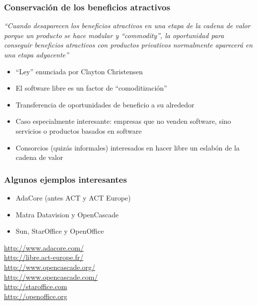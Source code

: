 \begin{frame}
\frametitle{Conservación de los beneficios atractivos}

{\em ``Cuando desaparecen los beneficios atractivos en una etapa de la
  cadena de valor porque un producto se hace modular y ``commodity'',
  la oportunidad para conseguir beneficios atractivos con productos
  privativos normalmente aparecerá en una etapa adyacente''}

\begin{itemize}
\item ``Ley'' enunciada por Clayton Christensen
\item El software libre es un factor de ``comoditización''
\item Transferencia de oportunidades de beneficio a su alrededor
\item Caso especialmente interesante: empresas que no venden software,
  sino servicios o productos basados en software
\item Consorcios (quizás informales) interesados en hacer libre un
  eslabón de la cadena de valor
\end{itemize}
\end{frame}



\begin{frame}
\frametitle{Algunos ejemplos interesantes}

\begin{itemize}
\item AdaCore (antes ACT y ACT Europe)
\item Matra Datavision y OpenCascade
\item Sun, StarOffice y OpenOffice
\end{itemize}

\begin{flushright}
  \url{http://www.adacore.com/}  \\
  \url{http://libre.act-europe.fr/} \\
  \url{http://www.opencascade.org/} \\
  \url{http://www.opencascade.com/} \\
  \url{http://staroffice.com} \\
  \url{http://openoffice.org}
\end{flushright}

\end{frame}



